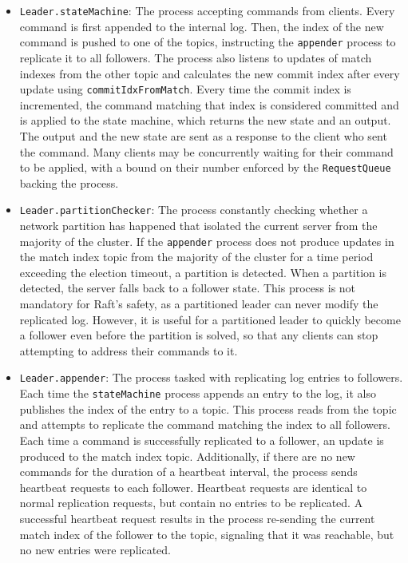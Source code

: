 \begin{itemize}
    \item \lstinline|Leader.stateMachine|: The process accepting commands from clients. Every command is first appended to the internal log. Then, the index of the new command is pushed to one of the topics, instructing the \lstinline|appender| process to replicate it to all followers. The process also listens to updates of match indexes from the other topic and calculates the new commit index after every update using \lstinline|commitIdxFromMatch|. Every time the commit index is incremented, the command matching that index is considered committed and is applied to the state machine, which returns the new state and an output. The output and the new state are sent as a response to the client who sent the command. Many clients may be concurrently waiting for their command to be applied, with a bound on their number enforced by the \lstinline|RequestQueue| backing the process.
    \item \lstinline|Leader.partitionChecker|: The process constantly checking whether a network partition has happened that isolated the current server from the majority of the cluster. If the \lstinline|appender| process does not produce updates in the match index topic from the majority of the cluster for a time period exceeding the election timeout, a partition is detected. When a partition is detected, the server falls back to a follower state. This process is not mandatory for Raft's safety, as a partitioned leader can never modify the replicated log. However, it is useful for a partitioned leader to quickly become a follower even before the partition is solved, so that any clients can stop attempting to address their commands to it.
    \item \lstinline|Leader.appender|: The process tasked with replicating log entries to followers. Each time the \lstinline|stateMachine| process appends an entry to the log, it also publishes the index of the entry to a topic. This process reads from the topic and attempts to replicate the command matching the index to all followers. Each time a command is successfully replicated to a follower, an update is produced to the match index topic. Additionally, if there are no new commands for the duration of a heartbeat interval, the process sends heartbeat requests to each follower. Heartbeat requests are identical to normal replication requests, but contain no entries to be replicated. A successful heartbeat request results in the process re-sending the current match index of the follower to the topic, signaling that it was reachable, but no new entries were replicated.

\end{itemize}
